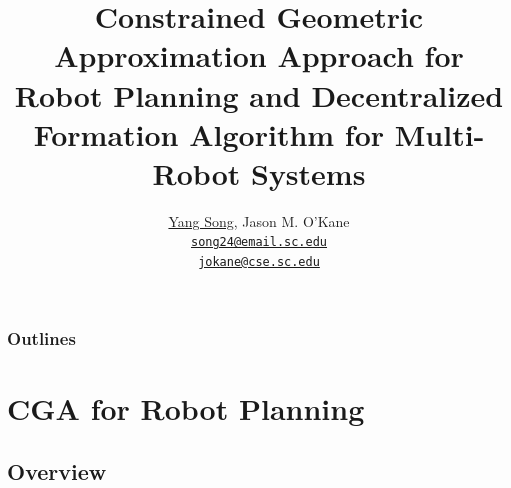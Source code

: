 \documentclass[10pt]{beamer}
\title{Constrained Geometric Approximation Approach for Robot Planning and
  Decentralized Formation Algorithm for Multi-Robot Systems}
\author{
  \underline{Yang Song}, Jason M. O'Kane\\
  \href{mailto:song24@email.sc.edu}{{\tt song24@email.sc.edu} \\
  \href{mailto:jokane@cse.sc.edu}{\tt jokane@cse.sc.edu}}
}
\institute[
  Dept.\ of Computer Science and Engineering\\
  University of South Carolina
] %
{%
  Dept. of Computer Science and Engineering\\
  University of South Carolina
  
}
\begin{document}
\begin{frame}[plain] %
  \titlepage
\end{frame}
\begin{frame}
  \frametitle{Outlines}
  \tableofcontents[]
\end{frame}
\section{CGA for Robot Planning}
\subsection[Problem]{Overview}
\end{document}
